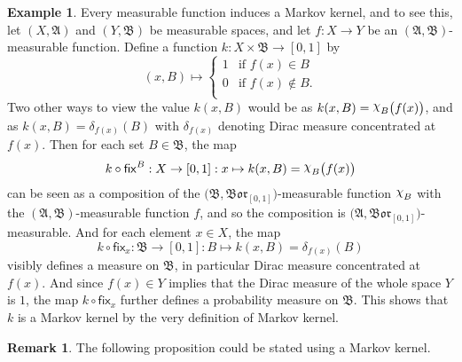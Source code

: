 \documentclass[
twoside=true,
paper=letter,
fontsize=11pt,
pagesize=auto,
leqno,
openany,
headsepline,
overfullrule,
]{scrbook}
\theoremstyle{plain}
\theoremstyle{plain}
\theoremstyle{definition}
\newtheorem{example}[thm]{Example}
\newtheorem{rmk}[thm]{Remark}
\theoremstyle{bfnoteitalic}
\theoremstyle{bfnoteroman}
\newcommand{\sigalg}[1]{\mathfrak{#1}}
\newcommand{\sfop}[1]{\mathsf{#1}}
\newcommand{\borel}{\mathfrak{Bor}}
\newcommand{\charfunction}[1]{{\raisebox{2pt}{$\chi$}}_{#1}}
\newcommand{\sigmaalgebra}{\sigalg{A}}
\newcommand{\sigmaalgebraii}{\sigalg{B}}
\newcommand{\function}{f}
\newcommand{\measurespace}{X}
\newcommand{\measurespaceii}{Y}
\newcommand{\mspaceelt}{x}
\newcommand{\diracmeasure}[1]{\delta_{#1}}
\newcommand{\setii}{B}
\newcommand{\markovkernel}{k}
\newcommand{\fixinthefirst}[1]{\sfop{fix}_{#1}}
\newcommand{\fixinthesecond}[1]{\sfop{fix}^{#1}}
\begin{document}
\begin{example}
Every measurable function induces a Markov kernel, and to see this, let
$(\measurespace, \sigmaalgebra)$ and 
$(\measurespaceii, \sigmaalgebraii)$ be measurable spaces, and let 
$\function: \measurespace \to \measurespaceii$ be an $(\sigmaalgebra, \sigmaalgebraii)$\hyp{}measurable function. 
Define a function $\markovkernel:\measurespace\times\sigmaalgebraii\to [0,1]$ by
\[
(\mspaceelt,\setii) \mapsto
\begin{cases}
1 & \text{if $\function(\mspaceelt) \in\setii$} \\
0 & \text{if $\function(\mspaceelt) \notin\setii$.} \\
\end{cases}
\]
Two other ways to view the value $\markovkernel(\mspaceelt, \setii)$ would be as 
$\markovkernel(\mspaceelt, \setii)
= 
\charfunction{\setii}\bigl(\function(\mspaceelt)\bigr)$,
and as
$\markovkernel(\mspaceelt, \setii)
=
\diracmeasure{\function(\mspaceelt)}(\setii)$ with 
$\diracmeasure{\function(\mspaceelt)}$ denoting Dirac measure concentrated at 
$\function(\mspaceelt)$.
Then for each set $\setii\in\sigmaalgebraii$, the map
\[
\markovkernel\circ\fixinthesecond{\setii}
: \measurespace\to [0,1]
: \mspaceelt\mapsto \markovkernel(\mspaceelt, \setii)
= 
\charfunction{\setii}\bigl(\function(\mspaceelt)\bigr)
\]
can be seen as a composition of the 
$\bigl(\sigmaalgebraii, \borel_{[0,1]}\bigr)$\hyp{}measurable function $\charfunction{\setii}$ with the 
$(\sigmaalgebra, \sigmaalgebraii)$\hyp{}measurable function 
$\function$, and so the composition is 
$\bigl(\sigmaalgebra, \borel_{[0,1]}\bigr)$\hyp{}measurable.
And for each element
$\mspaceelt\in\measurespace$,  the map
\[
\markovkernel\circ\fixinthefirst{\mspaceelt}
: \sigmaalgebraii\to [0,1]
: \setii\mapsto \markovkernel(\mspaceelt, \setii)
= 
\diracmeasure{\function(\mspaceelt)}(\setii)
\]
visibly defines a measure on
$\sigmaalgebraii$, in particular Dirac measure concentrated at 
$\function(\mspaceelt)$.  And since $\function(\mspaceelt)\in\measurespaceii$ implies that the Dirac measure of the whole space $\measurespaceii$ is $1$, the map 
$\markovkernel\circ\fixinthefirst{\mspaceelt}$ further defines a probability measure on
$\sigmaalgebraii$. 
This shows that $\markovkernel$ is a Markov kernel by the very definition of Markov kernel.
\end{example}

\begin{rmk}
The following proposition could be stated using a Markov kernel.
\end{rmk}
\end{document}
